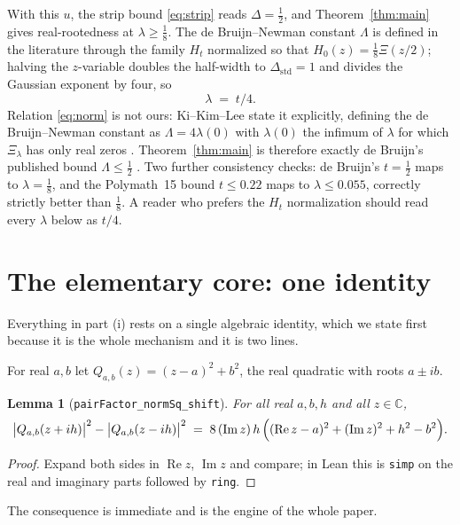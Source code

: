 \documentclass[11pt]{article}
\newtheorem{lemma}[theorem]{Lemma}
\theoremstyle{definition}
\DeclareMathOperator{\Imop}{Im}
\DeclareMathOperator{\Reop}{Re}
\begin{document}
With this $u$, the strip bound \eqref{eq:strip} reads $\Delta=\tfrac12$, and Theorem~\ref{thm:main}
gives real-rootedness at $\lambda\ge\tfrac18$.  The de Bruijn--Newman constant $\Lambda$ is defined in
the literature through the family $H_t$ normalized so that $H_0(z)=\tfrac18\Xi(z/2)$; halving the
$z$-variable doubles the half-width to $\Delta_{\text{std}}=1$ and divides the Gaussian exponent by
four, so
\begin{equation}\label{eq:norm}
  \lambda \;=\; t/4 .
\end{equation}
Relation \eqref{eq:norm} is not ours: Ki--Kim--Lee state it explicitly, defining the de Bruijn--Newman
constant as $\Lambda=4\lambda(0)$ with $\lambda(0)$ the infimum of $\lambda$ for which $\Xi_\lambda$ has
only real zeros \cite{KKL2009}.  Theorem~\ref{thm:main} is therefore exactly de Bruijn's published
bound $\Lambda\le\tfrac12$ \cite{deBruijn1950}.  Two further consistency checks: de Bruijn's
$t=\tfrac12$ maps to $\lambda=\tfrac18$, and the Polymath~15 bound $t\le0.22$
\cite{Polymath15} maps to $\lambda\le0.055$, correctly strictly better than $\tfrac18$.  A reader who
prefers the $H_t$ normalization should read every $\lambda$ below as $t/4$.

\section{The elementary core: one identity}\label{sec:core}

Everything in part (i) rests on a single algebraic identity, which we state first because it is the
whole mechanism and it is two lines.

For real $a,b$ let $Q_{a,b}(z)=(z-a)^{2}+b^{2}$, the real quadratic with roots $a\pm ib$.

\begin{lemma}[\texttt{pairFactor\_normSq\_shift}]\label{lem:core}
For all real $a,b,h$ and all $z\in\mathbb C$,
\[
  \bigl|Q_{a,b}(z+ih)\bigr|^{2}-\bigl|Q_{a,b}(z-ih)\bigr|^{2}
  \;=\;8\,(\Imop z)\,h\,\Bigl((\Reop z-a)^{2}+(\Imop z)^{2}+h^{2}-b^{2}\Bigr).
\]
\end{lemma}

\begin{proof}
Expand both sides in $\Reop z$, $\Imop z$ and compare; in Lean this is \texttt{simp} on the real and
imaginary parts followed by \texttt{ring}.
\end{proof}

The consequence is immediate and is the engine of the whole paper.
\end{document}
